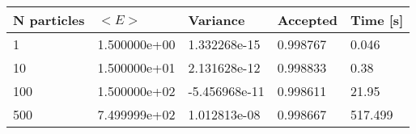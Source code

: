 \begin{table}[h!]
\begin{tabular}{|l|l|l|l|l|}
\hline 
N particles & $<E>$ & Variance & Accepted & Time [s]\\ 
 \hline 
1 & 1.500000e+00 & 1.332268e-15 & 0.998767 & 0.046 \\ \hline 
10 & 1.500000e+01 & 2.131628e-12 & 0.998833 & 0.38 \\ \hline 
100 & 1.500000e+02 & -5.456968e-11 & 0.998611 & 21.95 \\ \hline 
500 & 7.499999e+02 & 1.012813e-08 & 0.998667 & 517.499 \\ \hline 
\end{tabular}
\label{tab:in3} 
\end{table} 
